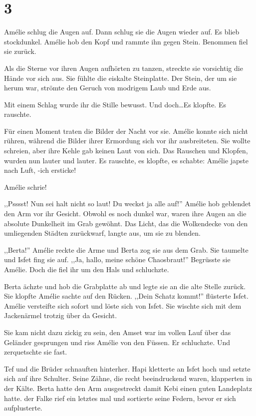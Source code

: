 \section*{3}

Amélie schlug die Augen auf. Dann schlug sie die Augen wieder auf. Es blieb stockdunkel. Amélie hob den Kopf und rammte ihn gegen Stein. Benommen fiel sie zurück. 

Als die Sterne vor ihren Augen aufhörten zu tanzen, streckte sie vorsichtig die Hände vor sich aus. Sie fühlte die eiskalte Steinplatte. Der Stein, der um sie herum war, strömte den Geruch von modrigem Laub und Erde aus.

Mit einem Schlag wurde ihr die Stille bewusst. Und doch\dots Es klopfte. Es rauschte. 

Für einen Moment traten die Bilder der Nacht vor sie. Amélie konnte sich nicht rühren, während die Bilder ihrer Ermordung sich vor ihr ausbreiteten. Sie wollte schreien, aber ihre Kehle gab keinen Laut von sich. Das Rauschen und Klopfen, wurden nun lauter und lauter. Es rauschte, es klopfte, es schabte: Amélie japste nach Luft, -ich ersticke!

Amélie schrie!

,,Psssst! Nun sei halt nicht so laut! Du weckst ja alle auf!'' Amélie hob geblendet den Arm vor ihr Gesicht. Obwohl es noch dunkel war, waren ihre Augen an die absolute Dunkelheit im Grab gewöhnt. Das Licht, das die Wolkendecke von den umliegenden Städten zurückwarf, langte aus, um sie zu blenden.

,,Berta!'' Amélie reckte die Arme und Berta zog sie aus dem Grab. Sie taumelte und Isfet fing sie auf. ,,Ja, hallo, meine schöne Chaosbraut!'' Begrüsste sie Amélie. Doch die fiel ihr um den Hals und schluchzte.

Berta ächzte und hob die Grabplatte ab und legte sie an die alte Stelle zurück. Sie klopfte Amélie sachte auf den Rücken. ,,Dein Schatz kommt!'' flüsterte Isfet. Amélie versteifte sich sofort und löste sich von Isfet. Sie wischte sich mit dem Jackenärmel trotzig über da Gesicht.

Sie kam nicht dazu zickig zu sein, den Amset war im vollen Lauf über das Geländer gesprungen und riss Amélie von den Füssen. Er schluchzte. Und zerquetschte sie fast.

Tef und die Brüder schnauften hinterher. Hapi kletterte an Isfet hoch und setzte sich auf ihre Schulter. Seine Zähne, die recht beeindruckend waren, klapperten in der Kälte. Berta hatte den Arm ausgestreckt damit Kebi einen guten Landeplatz hatte. der Falke rief ein letztes mal und sortierte seine Federn, bevor er sich aufplusterte.

